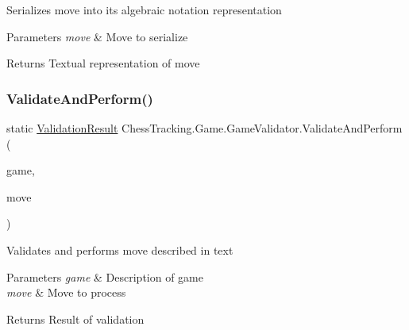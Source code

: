 Serializes move into its algebraic notation representation 


\begin{DoxyParams}{Parameters}
{\em move} & Move to serialize\\
\hline
\end{DoxyParams}
\begin{DoxyReturn}{Returns}
Textual representation of move
\end{DoxyReturn}
\mbox{\label{class_chess_tracking_1_1_game_1_1_game_validator_a55036629d94e4cb6960bad9a10a8635a}} 
\subsubsection{\texorpdfstring{ValidateAndPerform()}{ValidateAndPerform()}\hspace{0.1cm}{\footnotesize\ttfamily [1/3]}}
{\footnotesize\ttfamily static \mbox{\hyperlink{class_chess_tracking_1_1_game_1_1_validation_result}{Validation\+Result}} Chess\+Tracking.\+Game.\+Game\+Validator.\+Validate\+And\+Perform (\begin{DoxyParamCaption}\item[{\mbox{\hyperlink{class_chess_tracking_1_1_game_1_1_game_data}{Game\+Data}}}]{game,  }\item[{string}]{move }\end{DoxyParamCaption})\hspace{0.3cm}{\ttfamily [static]}}



Validates and performs move described in text 


\begin{DoxyParams}{Parameters}
{\em game} & Description of game\\
\hline
{\em move} & Move to process\\
\hline
\end{DoxyParams}
\begin{DoxyReturn}{Returns}
Result of validation
\end{DoxyReturn}
\mbox{\label{class_chess_tracking_1_1_game_1_1_game_validator_a5ab7f254ae447333762ff20d983c9899}} 
